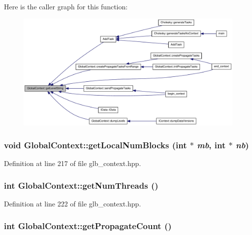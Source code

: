 Here is the caller graph for this function:\nopagebreak
\begin{figure}[H]
\begin{center}
\leavevmode
\includegraphics[width=394pt]{class_global_context_a3f1200ddc2119935fac3b8b4ef5143d1_icgraph}
\end{center}
\end{figure}
\hypertarget{class_global_context_a84061079f4d2d2fcdaeb3b201dd56cea}{
\subsubsection[{getLocalNumBlocks}]{\setlength{\rightskip}{0pt plus 5cm}void GlobalContext::getLocalNumBlocks (int $\ast$ {\em mb}, \/  int $\ast$ {\em nb})}}
\label{class_global_context_a84061079f4d2d2fcdaeb3b201dd56cea}


Definition at line 217 of file glb\_\-context.hpp.\hypertarget{class_global_context_acec7514378c7877e7ba92d23538ae05e}{
\subsubsection[{getNumThreads}]{\setlength{\rightskip}{0pt plus 5cm}int GlobalContext::getNumThreads ()}}
\label{class_global_context_acec7514378c7877e7ba92d23538ae05e}


Definition at line 222 of file glb\_\-context.hpp.\hypertarget{class_global_context_a62d3dff5570b1e9b14f2b5d7101e9110}{
\subsubsection[{getPropagateCount}]{\setlength{\rightskip}{0pt plus 5cm}int GlobalContext::getPropagateCount ()}}
\label{class_global_context_a62d3dff5570b1e9b14f2b5d7101e9110}


